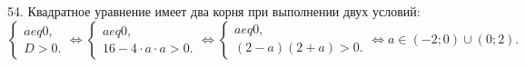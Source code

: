 54. Квадратное уравнение имеет два корня при выполнении двух условий:\\ $\begin{cases}a
eq0,\\ D>0.\end{cases}\Leftrightarrow
\begin{cases}a
eq0,\\ 16-4\cdot a \cdot a>0.\end{cases}\Leftrightarrow
\begin{cases}a
eq0,\\ (2-a)(2+a)>0.\end{cases}\Leftrightarrow a\in(-2;0)\cup(0;2).$\\
